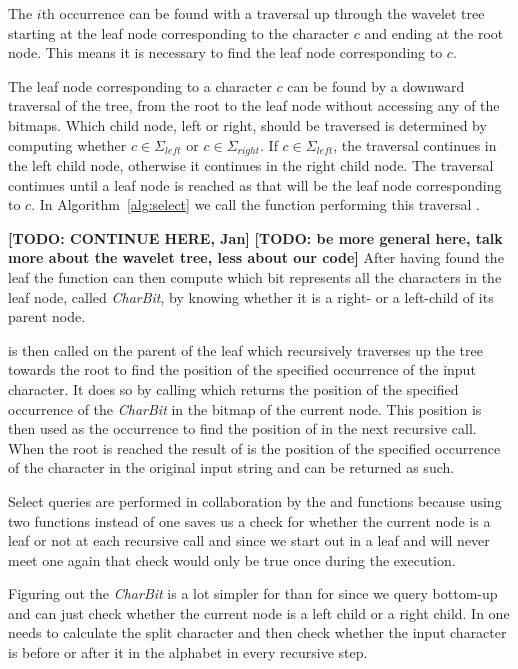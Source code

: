 The $i$th occurrence can be found with a traversal up through the wavelet tree starting at the leaf node corresponding to the character $c$ and ending at the root node.
This means it is necessary to find the leaf node corresponding to $c$.

The leaf node corresponding to a character $c$ can be found by a downward traversal of the tree, from the root to the leaf node without accessing any of the bitmaps.
Which child node, left or right, should be traversed is determined by computing whether $c \in \Sigma_{left}$ or $c \in \Sigma_{right}$.
If $c \in \Sigma_{left}$, the traversal continues in the left child node, otherwise it continues in the right child node.
The traversal continues until a leaf node is reached as that will be the leaf node corresponding to $c$.
In Algorithm~\ref{alg:select} we call the function performing this traversal .

\textbf{[TODO: CONTINUE HERE, Jan]} \textbf{[TODO: be more general here, talk more about the wavelet tree, less about our code]}
After having found the leaf the  function can then compute which bit represents all the characters in the leaf node, called \textit{CharBit}, by knowing whether it is a right- or a left-child of its parent node.

 is then called on the parent of the leaf which recursively traverses up the tree towards the root to find the position of the specified occurrence of the input character.
It does so by calling  which returns the position of the specified occurrence of the \textit{CharBit} in the bitmap of the current node. 
This position is then used as the occurrence to find the position of in the next recursive call.
When the root is reached the result of  is the position of the specified occurrence of the character in the original input string and can be returned as such.

Select queries are performed in collaboration by the  and  functions because using two functions instead of one saves us a check for whether the current node is a leaf or not at each recursive call and since we start out in a leaf and will never meet one again that check would only be true once during the execution.

Figuring out the \textit{CharBit} is a lot simpler for  than for  since we query bottom-up and can just check whether the current node is a left child or a right child. 
In  one needs to calculate the split character and then check whether the input character is before or after it in the alphabet in every recursive step.

